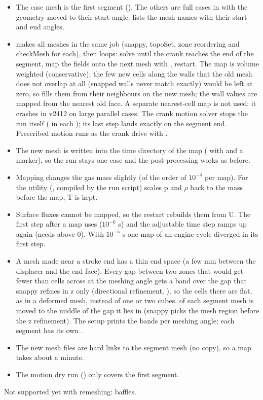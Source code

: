 \begin{itemize}
    \item The case mesh is the first segment (). The others are full cases in  with the geometry moved to their start angle.  lists the mesh names with their start and end angles.
    \item {} makes all meshes in the same job (snappy, topoSet, zone reordering and checkMesh for each), then loops: solve until the crank reaches the end of the segment, map the fields onto the next mesh with , restart. The map is volume weighted (conservative); the few new cells along the walls that the old mesh does not overlap at all (snapped walls never match exactly) would be left at zero, so  fills them from their neighbours on the new mesh; the wall values are mapped from the nearest old face. A separate nearest-cell map is not used: it crashes in v2412 on large parallel cases. The crank motion solver stops the run itself ( in each ); its last step lands exactly on the segment end. Prescribed motion runs as the crank drive with .
    \item The new mesh is written into the time directory of the map ( with  and a  marker), so the run stays one case and the post-processing works as before.
    \item Mapping changes the gas mass slightly (of the order of $10^{-4}$ per map). For  the utility  (, compiled by the run script) scales p and $\rho$ back to the mass before the map, T is kept.
    \item Surface fluxes cannot be mapped, so the restart rebuilds them from U. The first step after a map uses  ($10^{-6}$ s) and the adjustable time step ramps up again (needs  above 0). With $10^{-5}$ s one map of an engine cycle diverged in its first step.
    \item A mesh made near a stroke end has a thin end space (a few mm between the displacer and the end face). Every gap between two zones that would get fewer than  cells across at the meshing angle gets a band over the gap that snappy refines in z only (directional refinement, ), so the cells there are flat, as in a deformed mesh, instead of one or two cubes.  of each segment mesh is moved to the middle of the gap it lies in (snappy picks the mesh region before the z refinement). The setup prints the bands per meshing angle; each segment has its own .
    \item The new mesh files are hard links to the segment mesh (no copy), so a map takes about a minute.
    \item The motion dry run () only covers the first segment.
\end{itemize}
Not supported yet with remeshing:  baffles.

